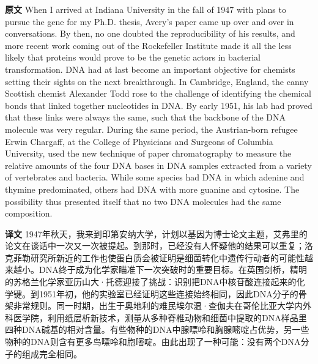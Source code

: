 \documentclass[UTF8,zihao=-4]{ctexart}
\newcommand{\BodyFont}{\fontsize{10.5pt}{15.5pt}\selectfont}
\renewenvironment{quote}{\par\noindent\begingroup\BodyFont}{\par\endgroup}
\begin{document}
\begin{quote}
\noindent\textbf{原文} When I arrived at Indiana University in the fall of 1947 with plans to pursue the gene for my Ph.D. thesis, Avery's paper came up over and over in conversations. By then, no one doubted the reproducibility of his results, and more recent work coming out of the Rockefeller Institute made it all the less likely that proteins would prove to be the genetic actors in bacterial transformation. DNA had at last become an important objective for chemists setting their sights on the next breakthrough. In Cambridge, England, the canny Scottish chemist Alexander Todd rose to the challenge of identifying the chemical bonds that linked together nucleotides in DNA. By early 1951, his lab had proved that these links were always the same, such that the backbone of the DNA molecule was very regular. During the same period, the Austrian-born refugee Erwin Chargaff, at the College of Physicians and Surgeons of Columbia University, used the new technique of paper chromatography to measure the relative amounts of the four DNA bases in DNA samples extracted from a variety of vertebrates and bacteria. While some species had DNA in which adenine and thymine predominated, others had DNA with more guanine and cytosine. The possibility thus presented itself that no two DNA molecules had the same composition.

\smallskip
\noindent\textbf{译文} 1947年秋天，我来到印第安纳大学，计划以基因为博士论文主题，艾弗里的论文在谈话中一次又一次被提起。到那时，已经没有人怀疑他的结果可以重复；洛克菲勒研究所新近的工作也使蛋白质会被证明是细菌转化中遗传行动者的可能性越来越小。DNA终于成为化学家瞄准下一次突破时的重要目标。在英国剑桥，精明的苏格兰化学家亚历山大·托德迎接了挑战：识别把DNA中核苷酸连接起来的化学键。到1951年初，他的实验室已经证明这些连接始终相同，因此DNA分子的骨架非常规则。同一时期，出生于奥地利的难民埃尔温·查伽夫在哥伦比亚大学内外科医学院，利用纸层析新技术，测量从多种脊椎动物和细菌中提取的DNA样品里四种DNA碱基的相对含量。有些物种的DNA中腺嘌呤和胸腺嘧啶占优势，另一些物种的DNA则含有更多鸟嘌呤和胞嘧啶。由此出现了一种可能：没有两个DNA分子的组成完全相同。
\end{quote}
\end{document}
